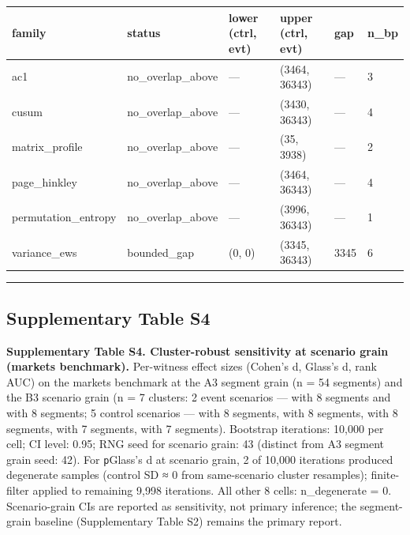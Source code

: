 \documentclass[
  11pt,
]{article}
\newcounter{none} %
\begin{document}
{\def\LTcaptype{none} %
\begin{longtable}[]{@{}llllll@{}}
\toprule\noalign{}
family & status & lower (ctrl, evt) & upper (ctrl, evt) & gap & n\_bp \\
\midrule\noalign{}
\endhead
\bottomrule\noalign{}
\endlastfoot
ac1 & no\_overlap\_above & --- & (3464, 36343) & --- & 3 \\
cusum & no\_overlap\_above & --- & (3430, 36343) & --- & 4 \\
matrix\_profile & no\_overlap\_above & --- & (35, 3938) & --- & 2 \\
page\_hinkley & no\_overlap\_above & --- & (3464, 36343) & --- & 4 \\
permutation\_entropy & no\_overlap\_above & --- & (3996, 36343) & --- &
1 \\
variance\_ews & bounded\_gap & (0, 0) & (3345, 36343) & 3345 & 6 \\
\end{longtable}
}

\begin{center}\rule{0.5\linewidth}{0.5pt}\end{center}

\subsection{Supplementary Table S4}\label{supplementary-table-s4}

\textbf{Supplementary Table S4. Cluster-robust sensitivity at scenario
grain (markets benchmark).} Per-witness effect sizes (Cohen's d, Glass's
d, rank AUC) on the markets benchmark at the A3 segment grain (n = 54
segments) and the B3 scenario grain (n = 7 clusters: 2 event scenarios
--- \texttt{} with 8 segments and
\texttt{} with 8 segments; 5 control scenarios
--- \texttt{} with 8 segments,
\texttt{} with 8 segments,
\texttt{} with 8 segments,
\texttt{} with 7 segments,
\texttt{} with 7 segments). Bootstrap
iterations: 10,000 per cell; CI level: 0.95; RNG seed for scenario
grain: 43 (distinct from A3 segment grain seed: 42). For
\texttt{p}\textbar Glass's d at scenario grain, 2 of 10,000 iterations
produced degenerate samples (control SD ≈ 0 from same-scenario cluster
resamples); finite-filter applied to remaining 9,998 iterations. All
other 8 cells: n\_degenerate = 0. Scenario-grain CIs are reported as
sensitivity, not primary inference; the segment-grain baseline
(Supplementary Table S2) remains the primary report.
\end{document}
